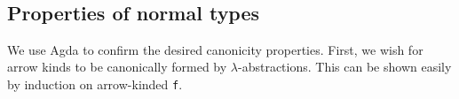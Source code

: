 \documentclass[authoryear, acmsmall, screen, review, nonacm]{acmart}
\begin{document}
\begin{code}[hide]
\>[0]\AgdaSpace{}%
\AgdaSpace{}%
\AgdaSymbol{(}\AgdaSpace{}%
\AgdaSymbol{)}\AgdaSpace{}%
\AgdaSymbol{=}\AgdaSpace{}%
\AgdaSpace{}%
\AgdaSymbol{(}\AgdaSpace{}%
\AgdaSpace{}%
\AgdaSymbol{)}\<%
\\
%
\\[\AgdaEmptyExtraSkip]%
\>[0]\AgdaSpace{}%
\AgdaSpace{}%
\AgdaSymbol{(}\AgdaSpace{}%
\AgdaSpace{}%
\AgdaSpace{}%
\AgdaOperator{\AgdaInductiveConstructor{\textasciitilde{}}}\AgdaSpace{}%
\AgdaSymbol{)}\AgdaSpace{}%
\AgdaSymbol{=}\AgdaSpace{}%
\AgdaSymbol{(}\AgdaSpace{}%
\AgdaSpace{}%
\AgdaSymbol{)}\AgdaSpace{}%
\AgdaSpace{}%
\AgdaSymbol{(}\AgdaSpace{}%
\AgdaSpace{}%
\AgdaSymbol{)}\AgdaSpace{}%
\AgdaOperator{\AgdaInductiveConstructor{\textasciitilde{}}}\AgdaSpace{}%
\AgdaSymbol{(}\AgdaSpace{}%
\AgdaSpace{}%
\AgdaSymbol{)}\<%
\\
\>[0]\AgdaSpace{}%
\AgdaSpace{}%
\AgdaSymbol{(}\AgdaSpace{}%
\AgdaSpace{}%
\AgdaSymbol{)}\AgdaSpace{}%
\AgdaSymbol{=}\AgdaSpace{}%
\AgdaSymbol{(}\AgdaSpace{}%
\AgdaSpace{}%
\AgdaSymbol{)}\AgdaSpace{}%
\AgdaSpace{}%
\AgdaSymbol{(}\AgdaSpace{}%
\AgdaSpace{}%
\AgdaSymbol{)}\<%
\\
%
\\[\AgdaEmptyExtraSkip]%
\>[0]\AgdaSpace{}%
\AgdaSymbol{=}\AgdaSpace{}%
\AgdaSpace{}%
\<%
\\
\>[0]\AgdaSpace{}%
\AgdaSymbol{=}\AgdaSpace{}%
\AgdaSpace{}%
\<%
\end{code}


\subsection{Properties of normal types}
We use Agda to confirm the desired canonicity properties. First, we wish for arrow kinds to be canonically formed by $\lambda$-abstractions. This can be shown easily by induction on arrow-kinded \verb!f!.
\end{document}
